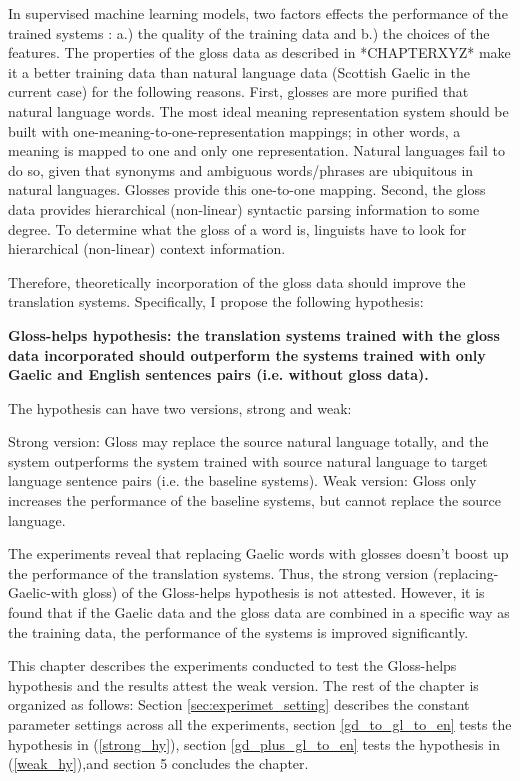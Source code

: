 \documentclass[a4paper]{article}
\begin{document}
In supervised machine learning models, two factors effects the performance of the trained systems \citep{kotsiantis2007supervised}: a.) the quality of the training data and b.) the choices of the features. The properties of the gloss data as described in *CHAPTERXYZ* make it a better training data than natural language data (Scottish Gaelic in the current case) for the following reasons. First, glosses are more purified that natural language words. The most ideal meaning representation system should be built with one-meaning-to-one-representation mappings; in other words, a meaning is mapped to one and only one representation. Natural languages fail to do so, given that synonyms and ambiguous words/phrases are ubiquitous in natural languages. Glosses provide this one-to-one mapping. Second, the gloss data provides hierarchical (non-linear) syntactic parsing information to some degree. To determine what the gloss of a word is, linguists have to look for hierarchical (non-linear) context information. 

Therefore, theoretically incorporation of the gloss data should improve the translation systems. Specifically, I propose the following hypothesis:
\begin{exe}  
\ex \textbf{Gloss-helps hypothesis: the translation systems trained with the gloss data incorporated should outperform the systems trained with only Gaelic and English sentences pairs (i.e. without gloss data).}

The hypothesis can have two versions, strong and weak:
	\begin{xlist}
	\ex \label{strong_hy} Strong version: Gloss may replace the source natural language totally, and the system outperforms the system trained with source natural language to target language sentence pairs (i.e. the baseline systems).   
	\ex \label{weak_hy} Weak version: Gloss only increases the performance of the baseline systems, but cannot replace the source language. 
	\end{xlist}
\end{exe}

The experiments reveal that replacing Gaelic words with glosses doesn't boost up the performance of the translation systems. Thus, the strong version (replacing-Gaelic-with gloss) of the Gloss-helps hypothesis is not attested. However, it is found that if the Gaelic data and the gloss data are combined in a specific way as the training data, the performance of the systems is improved significantly.  

This chapter describes the experiments conducted to test the Gloss-helps hypothesis and the results attest the weak version. 
The rest of the chapter is organized as follows: Section \ref{sec:experimet_setting} describes the constant parameter settings across all the experiments, section \ref{gd_to_gl_to_en} tests the hypothesis in (\ref{strong_hy}), section \ref{gd_plus_gl_to_en} tests the hypothesis in (\ref{weak_hy}),and section 5 concludes the chapter.  
\end{document}
